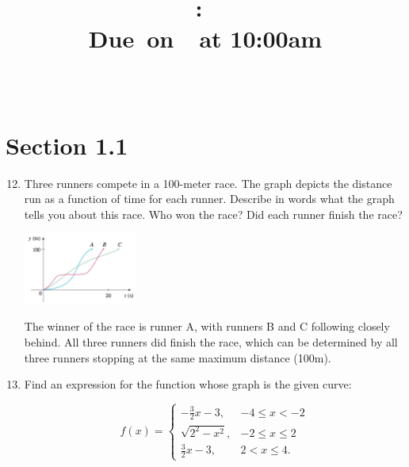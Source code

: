 \documentclass{article}
\title{
    \vspace{2in}
    \textmd{\textbf{\hmwkClass:\ \hmwkTitle}}\\
    \normalsize\vspace{0.1in}\small{Due\ on\ \hmwkDueDate\ at 10:00am}\\
    \vspace{0.1in}\large{\textit{\hmwkClassInstructor\ \hmwkClassTime}}
    \vspace{3in}
}
\author{\hmwkAuthorName}
\date{}
\begin{document}
\maketitle

\pagebreak


\section{Section 1.1}

\begin{enumerate}
\setcounter{enumi}{11}
	\item Three runners compete in a 100-meter race. The graph depicts the distance run as a function of time for each runner. Describe in words what the graph tells you about this race. Who won the race? Did each runner finish the race? \newline\begin{center}\includegraphics[width=140px]{images/hw1pr12}\newline\end{center}
	The winner of the race is runner A, with runners B and C following closely behind. All three runners did finish the race, which can be determined by all three runners stopping at the same maximum distance (100m).

\setcounter{enumi}{51}
  \item Find an expression for the function whose graph is the given curve: \newline
  \begin{center}
   
  \end{center}
  $$f(x)=\begin{cases} 
      		-\frac{3}{2}x-3, & -4 \leq x < -2 \\
      		\sqrt{2^2-x^2}, & -2 \leq x \leq 2 \\
      		\frac{3}{2}x-3, & 2 < x \leq 4.
   		\end{cases}$$
	

\end{enumerate}
\end{document}

